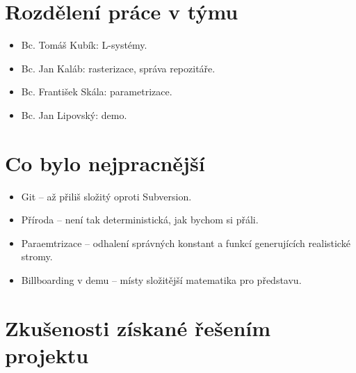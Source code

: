 \documentclass[11pt,a4paper]{article}
\begin{document}
\section{Rozdělení práce v týmu}

%

\begin{itemize}
\item Bc. Tomáš Kubík: L-systémy.
\item Bc. Jan Kaláb: rasterizace, správa repozitáře.
\item Bc. František Skála: parametrizace.
\item Bc. Jan Lipovský: demo.
\end{itemize}

\section{Co bylo nejpracnější}

%

\begin{itemize}
\item Git -- až přiliš složitý oproti Subversion.
\item Příroda -- není tak deterministická, jak bychom si přáli.
\item Paraemtrizace -- odhalení správných konstant a funkcí generujících realistické stromy.
\item Billboarding v demu -- místy složitější matematika pro představu.
\end{itemize}

\section{Zkušenosti získané řešením projektu}
\end{document}
